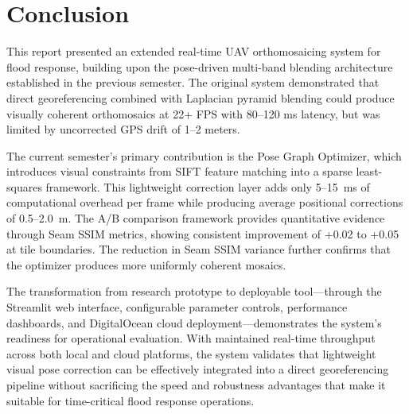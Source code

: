 \documentclass[conference]{IEEEtran}
\begin{document}
\section{Conclusion}

This report presented an extended real-time UAV orthomosaicing system for flood response, building upon the pose-driven multi-band blending architecture established in the previous semester. The original system demonstrated that direct georeferencing combined with Laplacian pyramid blending could produce visually coherent orthomosaics at 22+ FPS with 80--120 ms latency, but was limited by uncorrected GPS drift of 1--2 meters.

The current semester's primary contribution is the Pose Graph Optimizer, which introduces visual constraints from SIFT feature matching into a sparse least-squares framework. This lightweight correction layer adds only 5--15~ms of computational overhead per frame while producing average positional corrections of 0.5--2.0~m. The A/B comparison framework provides quantitative evidence through Seam SSIM metrics, showing consistent improvement of +0.02 to +0.05 at tile boundaries. The reduction in Seam SSIM variance further confirms that the optimizer produces more uniformly coherent mosaics.

The transformation from research prototype to deployable tool---through the Streamlit web interface, configurable parameter controls, performance dashboards, and DigitalOcean cloud deployment---demonstrates the system's readiness for operational evaluation. With maintained real-time throughput across both local and cloud platforms, the system validates that lightweight visual pose correction can be effectively integrated into a direct georeferencing pipeline without sacrificing the speed and robustness advantages that make it suitable for time-critical flood response operations.
\end{document}
